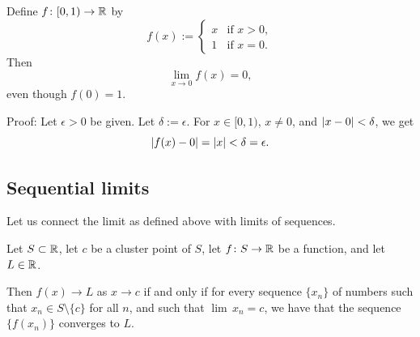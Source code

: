 \begin{example}
Define $f \colon [0,1) \to {\mathbb{R}}$ by
\begin{equation*}
f(x) := 
\begin{cases}
x & \text{if } x > 0 , \\
1 & \text{if } x = 0 .
\end{cases}
\end{equation*}
Then
\begin{equation*}
\lim_{x\to 0} f(x) = 0 ,
\end{equation*}
even though $f(0) = 1$.

Proof:  Let $\epsilon > 0$ be given.  Let $\delta := \epsilon$.
For $x \in [0,1)$, $x \not= 0$, and $\left\lvert {x-0} \right\rvert < \delta$, we get
\begin{equation*}
\left\lvert {f(x) - 0} \right\rvert = \left\lvert {x} \right\rvert < \delta = \epsilon .
\end{equation*}
\end{example}

\subsection{Sequential limits} \label{subseq:sequentiallimits}

Let us connect the limit as defined above with limits of sequences.

\begin{lemma}\label{seqflimit:lemma}
Let $S \subset {\mathbb{R}}$, let $c$ be a cluster point of $S$, let $f \colon S \to
{\mathbb{R}}$ be a function, and let $L \in {\mathbb{R}}$.

Then
$f(x) \to L$ as $x \to c$ if and only if for every sequence $\{ x_n \}$
of numbers such that $x_n \in S \setminus \{c\}$ for all $n$,
and such that $\lim\, x_n = c$,
we have that the sequence $\{ f(x_n) \}$ converges to $L$.
\end{lemma}

